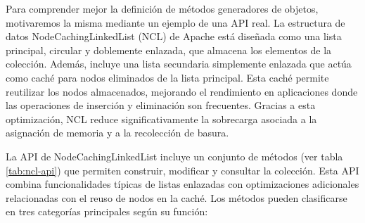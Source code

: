 

Para comprender mejor la definición de métodos generadores de objetos, motivaremos la misma mediante un ejemplo de una API real. La estructura de datos NodeCachingLinkedList (NCL) de Apache \cite{apache} está diseñada como una lista principal, circular y doblemente enlazada, que almacena los elementos de la colección. Además, incluye una lista secundaria simplemente enlazada que actúa como caché para nodos eliminados de la lista principal. Esta caché permite reutilizar los nodos almacenados, mejorando el rendimiento en aplicaciones donde las operaciones de inserción y eliminación son frecuentes. Gracias a esta optimización, NCL reduce significativamente la sobrecarga asociada a la asignación de memoria y a la recolección de basura. 

La API de NodeCachingLinkedList incluye un conjunto de métodos (ver tabla \ref{tab:ncl-api}) que permiten construir, modificar y consultar la colección. Esta API combina funcionalidades típicas de listas enlazadas con optimizaciones adicionales relacionadas con el reuso de nodos en la caché. Los métodos pueden clasificarse en tres categorías principales según su función: 

